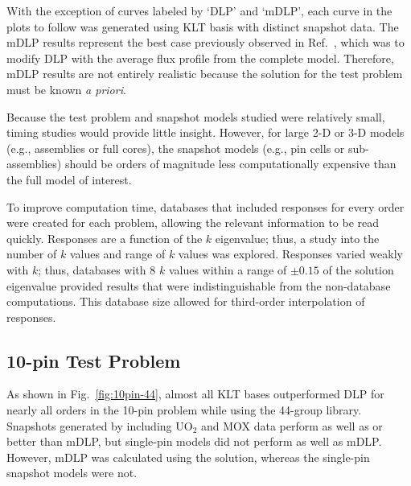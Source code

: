 \documentclass[5p,times,twocolumn,10pt]{elsarticle}
\newcommand{\REF}[1]{Ref.~\citen{#1}}               %
\begin{document}
    With the exception of curves labeled by `DLP' and `mDLP', each curve in
    the plots to follow was generated using KLT
    basis with distinct snapshot data.
    The mDLP results represent the best case previously observed in
    \REF{Roberts2014}, which was to modify DLP with
    the average flux profile from the complete model.  Therefore, mDLP results
    are not entirely realistic because the solution
    for the test problem must be known {\it a priori}.

    Because the test problem and snapshot models studied were relatively small,
    timing studies would
    provide little insight.  However, for large 2-D or 3-D models (e.g.,
    assemblies or full cores), the snapshot
    models (e.g., pin cells or sub-assemblies) should be orders of magnitude
    less computationally expensive
    than the full model of interest.

    To improve computation time, databases that included responses for every
    order were created for each problem,
    allowing the relevant information to be read quickly.  Responses are a
    function of the $k$ eigenvalue; thus, a study into
    the number of $k$ values and range of $k$ values was explored.  Responses
    varied weakly with $k$; thus, databases with 8 $k$ values
    within a range of $\pm0.15$ of the solution eigenvalue provided results
that were indistinguishable from the non-database computations. This database
size allowed
    for third-order interpolation of responses.

    \subsection{10-pin Test Problem}

    As shown in Fig.~\ref{fig:10pin-44}, almost all KLT bases outperformed DLP
    for nearly all orders in the 10-pin problem while using the 44-group
    library.
    Snapshots generated by including UO$_2$ and MOX data perform as well as or
    better than mDLP, but single-pin
    models did not perform as well as mDLP.  However, mDLP was calculated using
    the solution, whereas the single-pin snapshot models were not.
\end{document}
